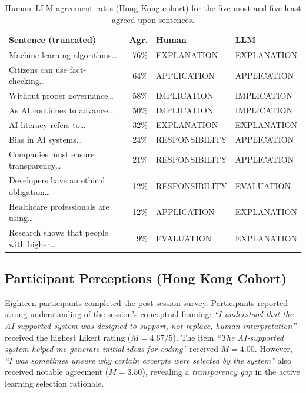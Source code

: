 \documentclass[fleqn,10pt]{JLA_article}
\begin{document}
\begin{table}[hbt]
\caption{Human--LLM agreement rates (Hong Kong cohort) for the five most and five
  least agreed-upon sentences.}
\label{tab:unit_agree}
\centering
\small
\begin{tabular}{p{5.5cm}rll}
\toprule
\textbf{Sentence (truncated)} & \textbf{Agr.} & \textbf{Human} & \textbf{LLM} \\
\midrule
Machine learning algorithms\ldots & 76\% & EXPLANATION & EXPLANATION \\
Citizens can use fact-checking\ldots & 64\% & APPLICATION & APPLICATION \\
Without proper governance\ldots & 58\% & IMPLICATION & IMPLICATION \\
As AI continues to advance\ldots & 50\% & IMPLICATION & IMPLICATION \\
AI literacy refers to\ldots & 32\% & EXPLANATION & EXPLANATION \\
\midrule
Bias in AI systems\ldots & 24\% & RESPONSIBILITY & APPLICATION \\
Companies must ensure transparency\ldots & 21\% & RESPONSIBILITY & APPLICATION \\
Developers have an ethical obligation\ldots & 12\% & RESPONSIBILITY & EVALUATION \\
Healthcare professionals are using\ldots & 12\% & APPLICATION & EXPLANATION \\
Research shows that people with higher\ldots &  9\% & EVALUATION & EXPLANATION \\
\bottomrule
\end{tabular}
\end{table}

\subsection{Participant Perceptions (Hong Kong Cohort)}

Eighteen participants completed the post-session survey. Participants reported strong
understanding of the session's conceptual framing: \emph{``I understood that the
AI-supported system was designed to support, not replace, human interpretation''} received
the highest Likert rating ($M = 4.67/5$). The item \emph{``The AI-supported system helped me
generate initial ideas for coding''} received $M = 4.00$. However, \emph{``I was sometimes
unsure why certain excerpts were selected by the system''} also received notable agreement
($M = 3.50$), revealing a \emph{transparency gap} in the active learning selection rationale.
\end{document}
